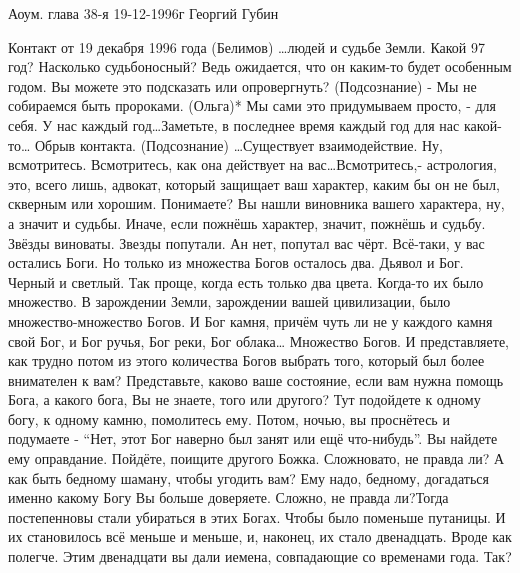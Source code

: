 Аоум. глава 38-я 19-12-1996г
Георгий Губин
\people{**}
 
 
Контакт от 19 декабря 1996 года  
\people{**}
(Белимов) …людей и судьбе Земли. Какой 97 год? Насколько судьбоносный? Ведь ожидается, что он каким-то будет особенным  годом. Вы можете это подсказать или опровергнуть?
(Подсознание) - Мы не собираемся быть пророками. 
(Ольга)* Мы сами это придумываем просто, - для себя. У нас каждый год…Заметьте, в последнее время каждый год для нас какой-то… 
Обрыв контакта.
(Подсознание) …Существует взаимодействие. Ну, всмотритесь. Всмотритесь, как она действует на вас…Всмотритесь,- астрология, это, всего лишь, адвокат, который защищает ваш характер, каким бы он не был, скверным или хорошим. Понимаете?  Вы нашли виновника вашего характера, ну, а значит и судьбы. Иначе, если пожнёшь характер, значит, пожнёшь и судьбу. Звёзды виноваты. Звезды попутали. Ан нет, попутал вас чёрт. Всё-таки, у вас остались Боги. Но только из множества Богов осталось  два. Дьявол и Бог. Черный и светлый. Так проще, когда есть только два цвета. Когда-то их было множество.  В зарождении Земли, зарождении вашей цивилизации, было множество-множество Богов. И Бог камня, причём чуть ли не у каждого камня свой Бог, и  Бог ручья, Бог реки, Бог облака… Множество Богов. И представляете, как трудно потом из этого количества Богов выбрать того, который был более внимателен к вам? Представьте, каково ваше состояние, если вам нужна помощь Бога, а какого бога, Вы не знаете, того или другого? Тут подойдете к одному богу, к одному камню, помолитесь ему. Потом, ночью, вы проснётесь и  подумаете - ``Нет, этот Бог наверно был занят или ещё что-нибудь''. Вы найдете ему оправдание. Пойдёте, поищите другого Божка. Сложновато, не правда ли? А как быть бедному шаману, чтобы угодить вам? Ему надо, бедному, догадаться именно какому Богу Вы больше доверяете. Сложно, не правда ли?Тогда постепенновы стали убираться в этих Богах. Чтобы было поменьше путаницы. И их становилось всё меньше и меньше, и, наконец, их стало двенадцать. Вроде как полегче. Этим двенадцати вы дали иемена, совпадающие со временами года. Так?
